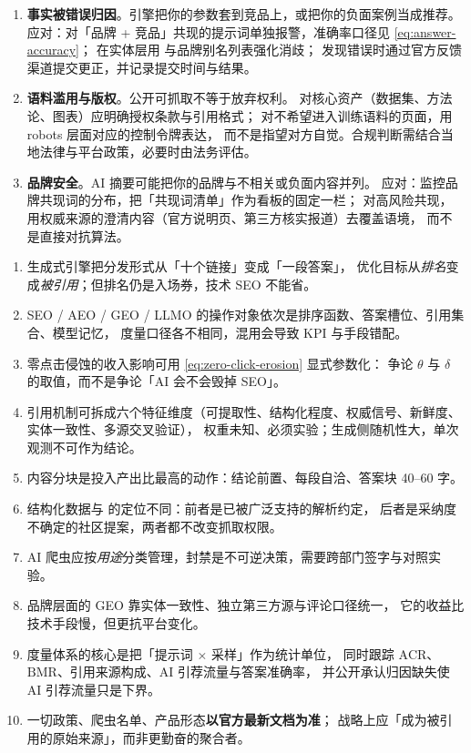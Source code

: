 \begin{enumerate}
  \item \textbf{事实被错误归因}。引擎把你的参数套到竞品上，或把你的负面案例当成推荐。
        应对：对「品牌 + 竞品」共现的提示词单独报警，准确率口径见 \cref{eq:answer-accuracy}；
        在实体层用  与品牌别名列表强化消歧；
        发现错误时通过官方反馈渠道提交更正，并记录提交时间与结果。
  \item \textbf{语料滥用与版权}。公开可抓取不等于放弃权利。
        对核心资产（数据集、方法论、图表）应明确授权条款与引用格式；
        对不希望进入训练语料的页面，用 robots 层面对应的控制令牌表达，
        而不是指望对方自觉。合规判断需结合当地法律与平台政策，必要时由法务评估。
  \item \textbf{品牌安全}。AI 摘要可能把你的品牌与不相关或负面内容并列。
        应对：监控品牌共现词的分布，把「共现词清单」作为看板的固定一栏；
        对高风险共现，用权威来源的澄清内容（官方说明页、第三方核实报道）去覆盖语境，
        而不是直接对抗算法。
\end{enumerate}

\begin{keypoint}[本章要点回顾]
\begin{enumerate}
  \item 生成式引擎把分发形式从「十个链接」变成「一段答案」，
        优化目标从\emph{排名}变成\emph{被引用}；但排名仍是入场券，技术 SEO 不能省。
  \item SEO / AEO / GEO / LLMO 的操作对象依次是排序函数、答案槽位、引用集合、模型记忆，
        度量口径各不相同，混用会导致 KPI 与手段错配。
  \item 零点击侵蚀的收入影响可用 \cref{eq:zero-click-erosion} 显式参数化：
        争论 $\theta$ 与 $\delta$ 的取值，而不是争论「AI 会不会毁掉 SEO」。
  \item 引用机制可拆成六个特征维度（可提取性、结构化程度、权威信号、新鲜度、实体一致性、多源交叉验证），
        权重未知、必须实验；生成侧随机性大，单次观测不可作为结论。
  \item 内容分块是投入产出比最高的动作：结论前置、每段自洽、答案块 40--60 字。
  \item 结构化数据与  的定位不同：前者是已被广泛支持的解析约定，
        后者是采纳度不确定的社区提案，两者都不改变抓取权限。
  \item AI 爬虫应按\emph{用途}分类管理，封禁是不可逆决策，需要跨部门签字与对照实验。
  \item 品牌层面的 GEO 靠实体一致性、独立第三方源与评论口径统一，
        它的收益比技术手段慢，但更抗平台变化。
  \item 度量体系的核心是把「提示词 $\times$ 采样」作为统计单位，
        同时跟踪 $\mathrm{ACR}$、$\mathrm{BMR}$、引用来源构成、AI 引荐流量与答案准确率，
        并公开承认归因缺失使 AI 引荐流量只是下界。
  \item 一切政策、爬虫名单、产品形态\textbf{以官方最新文档为准}；
        战略上应「成为被引用的原始来源」，而非更勤奋的聚合者。
\end{enumerate}
\end{keypoint}

